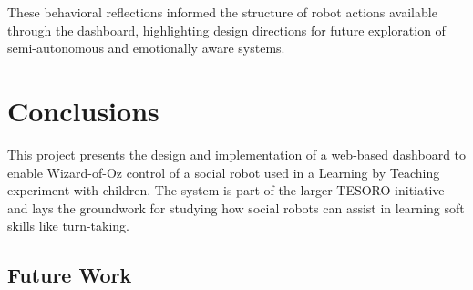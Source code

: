 \documentclass[a4paper]{usiinfbachelorproject}
\begin{document}
These behavioral reflections informed the structure of robot actions available through the dashboard, highlighting design directions for future exploration of semi-autonomous and emotionally aware systems.

\newpage

\section{\textbf{Conclusions}}\label{sec:conclusions}
This project presents the design and implementation of a web-based dashboard to enable Wizard-of-Oz control of a social robot used in a Learning by Teaching experiment with children.
The system is part of the larger TESORO initiative and lays the groundwork for studying how social robots can assist in learning soft skills like turn-taking.

\subsection{\textbf{Future Work}}

\newpage



\end{document}
